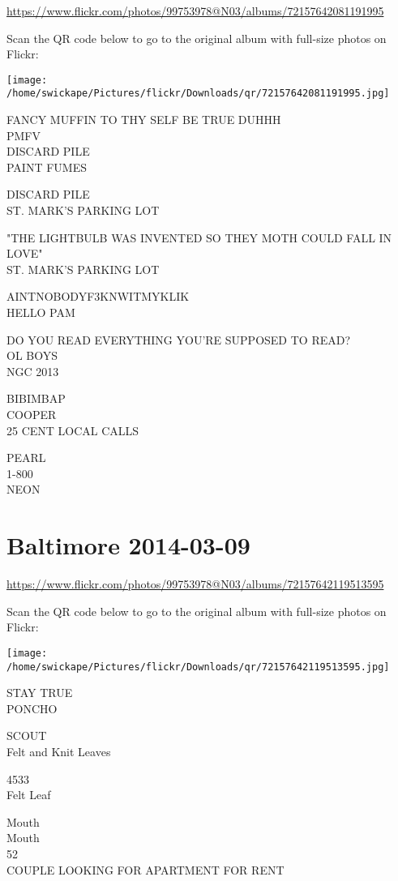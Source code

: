 \documentclass[10pt,letterpaper]{article}
\begin{document}
\url{https://www.flickr.com/photos/99753978@N03/albums/72157642081191995}

Scan the QR code below to go to the original album with full-size photos on Flickr:

\texttt{[image: /home/swickape/Pictures/flickr/Downloads/qr/72157642081191995.jpg]}


FANCY MUFFIN TO THY SELF BE TRUE DUHHH\\
PMFV\\
DISCARD PILE\\
PAINT FUMES

DISCARD PILE\\
ST. MARK'S PARKING LOT

"THE LIGHTBULB WAS INVENTED SO THEY MOTH COULD FALL IN LOVE"\\
ST. MARK'S PARKING LOT

AINTNOBODYF3KNWITMYKLIK\\
HELLO PAM

DO YOU READ EVERYTHING YOU'RE SUPPOSED TO READ?\\
OL BOYS\\
NGC 2013

BIBIMBAP\\
COOPER\\
25 CENT LOCAL CALLS

PEARL\\
1{-}800\\
NEON


\section*{Baltimore 2014-03-09}

\url{https://www.flickr.com/photos/99753978@N03/albums/72157642119513595}

Scan the QR code below to go to the original album with full-size photos on Flickr:

\texttt{[image: /home/swickape/Pictures/flickr/Downloads/qr/72157642119513595.jpg]}


STAY TRUE\\
PONCHO

SCOUT\\
Felt and Knit Leaves

4533\\
Felt Leaf

Mouth\\
Mouth\\
52\\
COUPLE LOOKING FOR APARTMENT FOR RENT
\end{document}
